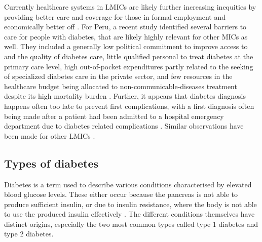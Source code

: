 Currently healthcare systems in \acp{LMIC} are likely further increasing inequities by providing better care and coverage for those in formal employment and economically better off \parencite{Mills2014,DiCesare2013}. For Peru, a recent study identified several barriers to care for people with diabetes, that are likely highly relevant for other \acp{MIC} as well. They included a generally low political commitment to improve access to and the quality of diabetes care, little qualified personal to treat diabetes at the primary care level, high out-of-pocket expenditures partly related to the seeking of specialized diabetes care in the private sector, and few resources in the healthcare budget being allocated to non-communicable-diseases treatment despite its high mortality burden \parencite{Cardenas2016}. Further, it appears that diabetes diagnosis happens often too late to prevent first complications, with a first diagnosis often being made after a patient had been admitted to a hospital emergency department due to diabetes related complications \parencite{Cardenas2016}. Similar observations have been made for other \acp{LMIC} \parencite{Beran2015,WHO2014}.

 
\subsection{Types of diabetes}

Diabetes is a term used to describe various conditions characterised by elevated blood glucose levels. These either occur because the pancreas is not able to produce sufficient insulin, or due to insulin resistance, where the body is not able to use the produced insulin effectively \parencite{WorldHealthOrganization2016}. The different conditions themselves have distinct origins, especially the two most common types called type 1 diabetes and type 2 diabetes. 

